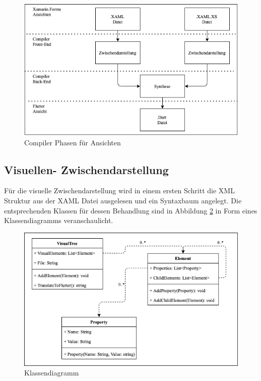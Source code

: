 \begin{figure}[!ht]
 \includegraphics[width=\textwidth,keepaspectratio]{Images/Implementation/ViewCompiler.png}
 \caption{Compiler Phasen für Ansichten}
 \label{fig:ViewCompilerPhases}
\end{figure}

\subsection{Visuellen- Zwischendarstellung}

Für die visuelle Zwischendarstellung wird in einem ersten Schritt die XML Struktur
aus der XAML Datei ausgelesen und ein Syntaxbaum angelegt.  Die entsprechenden Klassen für dessen Behandlung sind in Abbildung \ref{fig:Klassendiagram} in Form eines Klassendiagramms veranschaulicht.

\begin{figure}[!ht]
 \includegraphics[width=\textwidth,keepaspectratio]{Images/Implementation/Klassendiagram.png}
 \caption{Klassendiagramm}
 \label{fig:Klassendiagram}
\end{figure}

